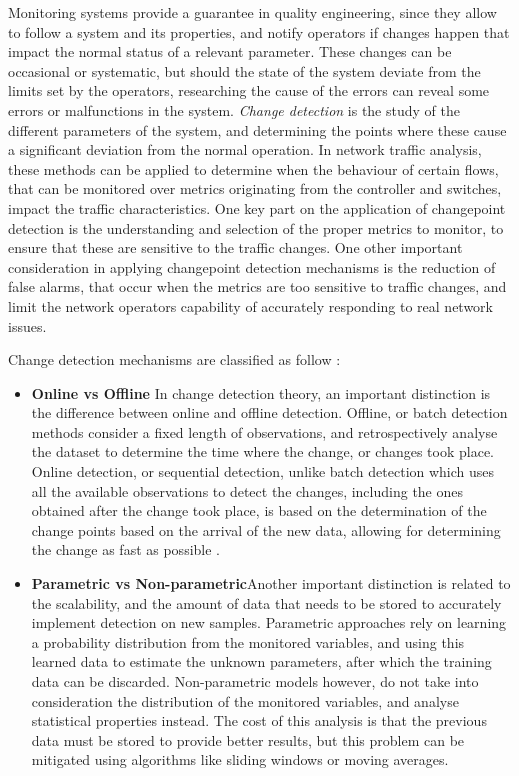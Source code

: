 \par Monitoring systems provide a guarantee in quality engineering, since they allow to follow a system and its properties, and notify operators if changes happen
that impact the normal status of a relevant parameter. These changes can be occasional or systematic, but should the state of the system deviate from the limits set
by the operators, researching the cause of the errors can reveal some errors or malfunctions in the system. \textit{Change detection} is the study of the different 
parameters of the system, and determining the points where these cause a significant deviation from the normal operation. In network traffic analysis, these methods
can be applied to determine when the behaviour of certain flows, that can be monitored over metrics originating from the controller and switches, impact the traffic
characteristics. One key part on the application of changepoint detection is the understanding and selection of the proper metrics to monitor, to ensure that these
are sensitive to the traffic changes. One other important consideration in applying changepoint detection mechanisms is the reduction of false alarms, that occur 
when the metrics are too sensitive to traffic changes, and limit the network operators capability of accurately responding to real network issues. 

\par Change detection mechanisms are classified as follow \cite{munz_traffic_2010}:

\begin {itemize}
    \item \textbf{Online vs Offline} In change detection theory, an important distinction is the difference between online and offline detection. Offline, or batch 
        detection methods consider a fixed length of observations, and retrospectively analyse the dataset to determine the time where the change, or changes took 
        place.  Online detection, or sequential detection, unlike batch detection which uses all the available observations to detect the changes, including the
        ones obtained after the change took place, is based on the determination of the change points based on the arrival of the new data, allowing for determining
        the change as fast as possible \cite{ahmed_novel_2008}. 
    \item \textbf{Parametric vs Non-parametric}Another important distinction is related to the scalability, and the amount of data that needs to be stored to 
        accurately implement detection on new samples. Parametric approaches rely on learning a probability distribution from the monitored variables, and using 
        this learned data to estimate the unknown parameters, after which the training data can be discarded. Non-parametric models however, do not take into 
        consideration the distribution of the monitored variables, and analyse statistical properties instead. The cost of this analysis is that the previous data 
        must be stored to provide better results, but this problem can be mitigated using algorithms like sliding windows or moving averages.
\end {itemize}

